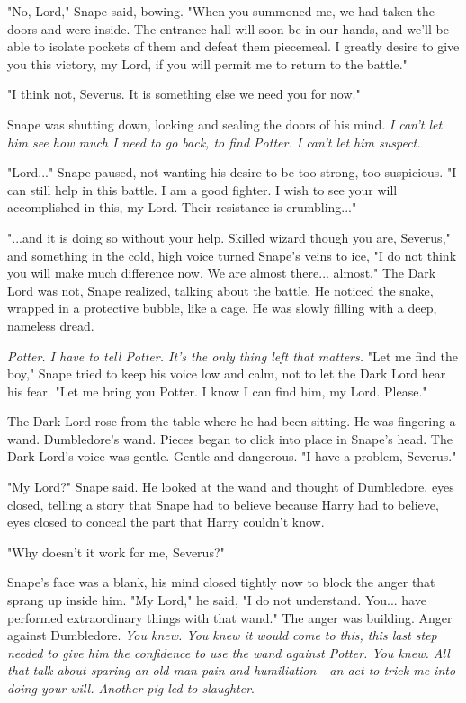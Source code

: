 "No, Lord," Snape said, bowing. "When you summoned me, we had taken the doors and were inside. The entrance hall will soon be in our hands, and we'll be able to isolate pockets of them and defeat them piecemeal. I greatly desire to give you this victory, my Lord, if you will permit me to return to the battle."

"I think not, Severus. It is something else we need you for now."

Snape was shutting down, locking and sealing the doors of his mind. \emph{I can't let him see how much I need to go back, to find Potter. I can't let him suspect.}

"Lord..." Snape paused, not wanting his desire to be too strong, too suspicious. "I can still help in this battle. I am a good fighter. I wish to see your will accomplished in this, my Lord. Their resistance is crumbling..."

"...and it is doing so without your help. Skilled wizard though you are, Severus," and something in the cold, high voice turned Snape's veins to ice, "I do not think you will make much difference now. We are almost there... almost." The Dark Lord was not, Snape realized, talking about the battle. He noticed the snake, wrapped in a protective bubble, like a cage. He was slowly filling with a deep, nameless dread.

\emph{Potter. I have to tell Potter. It's the only thing left that matters.} "Let me find the boy," Snape tried to keep his voice low and calm, not to let the Dark Lord hear his fear. "Let me bring you Potter. I know I can find him, my Lord. Please."

The Dark Lord rose from the table where he had been sitting. He was fingering a wand. Dumbledore's wand. Pieces began to click into place in Snape's head. The Dark Lord's voice was gentle. Gentle and dangerous. "I have a problem, Severus."

"My Lord?" Snape said. He looked at the wand and thought of Dumbledore, eyes closed, telling a story that Snape had to believe because Harry had to believe, eyes closed to conceal the part that Harry couldn't know.

"Why doesn't it work for me, Severus?"

Snape's face was a blank, his mind closed tightly now to block the anger that sprang up inside him. "My Lord," he said, "I do not understand. You... have performed extraordinary things with that wand." The anger was building. Anger against Dumbledore. \emph{You knew. You knew it would come to this, this last step needed to give him the confidence to use the wand against Potter. You knew. All that talk about sparing an old man pain and humiliation - an act to trick me into doing your will. Another pig led to slaughter}.

